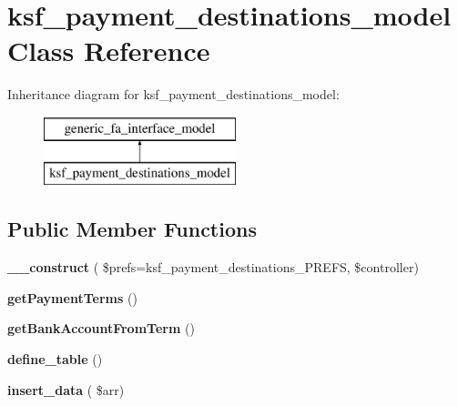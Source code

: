 \hypertarget{classksf__payment__destinations__model}{}\section{ksf\+\_\+payment\+\_\+destinations\+\_\+model Class Reference}
\label{classksf__payment__destinations__model}
Inheritance diagram for ksf\+\_\+payment\+\_\+destinations\+\_\+model\+:\begin{figure}[H]
\begin{center}
\leavevmode
\includegraphics[height=2.000000cm]{df/df9/classksf__payment__destinations__model}
\end{center}
\end{figure}
\subsection*{Public Member Functions}
\begin{DoxyCompactItemize}
\item 
\hypertarget{classksf__payment__destinations__model_a7d2b7eaf468a2056429c887cc1c1af2c}{}\label{classksf__payment__destinations__model_a7d2b7eaf468a2056429c887cc1c1af2c} 
{\bfseries \+\_\+\+\_\+construct} ( \$prefs=ksf\+\_\+payment\+\_\+destinations\+\_\+\+P\+R\+E\+FS, \$controller)
\item 
\hypertarget{classksf__payment__destinations__model_a211128ded82e9e457860a1c025e0efa0}{}\label{classksf__payment__destinations__model_a211128ded82e9e457860a1c025e0efa0} 
{\bfseries get\+Payment\+Terms} ()
\item 
\hypertarget{classksf__payment__destinations__model_ada952f529b48c0e4060073be420098de}{}\label{classksf__payment__destinations__model_ada952f529b48c0e4060073be420098de} 
{\bfseries get\+Bank\+Account\+From\+Term} ()
\item 
\hypertarget{classksf__payment__destinations__model_a46e00553b2989537613cc99d3c9913d5}{}\label{classksf__payment__destinations__model_a46e00553b2989537613cc99d3c9913d5} 
{\bfseries define\+\_\+table} ()
\item 
\hypertarget{classksf__payment__destinations__model_a6de8af4e189cb93307bce8d6955a8b4d}{}\label{classksf__payment__destinations__model_a6de8af4e189cb93307bce8d6955a8b4d} 
{\bfseries insert\+\_\+data} ( \$arr)
\end{DoxyCompactItemize}
